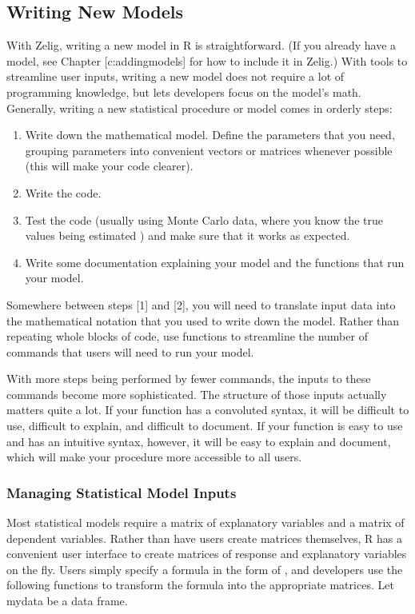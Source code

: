 \documentclass[letterpaper,10pt,english]{sphinxmanual}
\begin{document}
\subsection{Writing New Models}
\label{docs/dev_guide:writing-new-models}\label{docs/dev_guide:devguide-writing-new-models}
With Zelig, writing a new model in R is straightforward. (If you already
have a model, see Chapter {[}c:addingmodels{]} for how to include it in
Zelig.) With tools to streamline user inputs, writing a new model does
not require a lot of programming knowledge, but lets developers focus on
the model’s math. Generally, writing a new statistical procedure or
model comes in orderly steps:
\begin{enumerate}
\item {} 
Write down the mathematical model. Define the parameters that you
need, grouping parameters into convenient vectors or matrices
whenever possible (this will make your code clearer).

\item {} 
Write the code.

\item {} 
Test the code (usually using Monte Carlo data, where you know the
true values being estimated ) and make sure that it works as
expected.

\item {} 
Write some documentation explaining your model and the functions that
run your model.

\end{enumerate}

Somewhere between steps {[}1{]} and {[}2{]}, you will need to translate input
data into the mathematical notation that you used to write down the
model. Rather than repeating whole blocks of code, use functions to
streamline the number of commands that users will need to run your
model.

With more steps being performed by fewer commands, the inputs to these
commands become more sophisticated. The structure of those inputs
actually matters quite a lot. If your function has a convoluted syntax,
it will be difficult to use, difficult to explain, and difficult to
document. If your function is easy to use and has an intuitive syntax,
however, it will be easy to explain and document, which will make your
procedure more accessible to all users.


\subsubsection{Managing Statistical Model Inputs}
\label{docs/dev_guide:managing-statistical-model-inputs}
Most statistical models require a matrix of explanatory variables and a
matrix of dependent variables. Rather than have users create matrices
themselves, R has a convenient user interface to create matrices of
response and explanatory variables on the fly. Users simply specify a
formula in the form of , and
developers use the following functions to transform the formula into the
appropriate matrices. Let mydata be a data frame.
\end{document}

